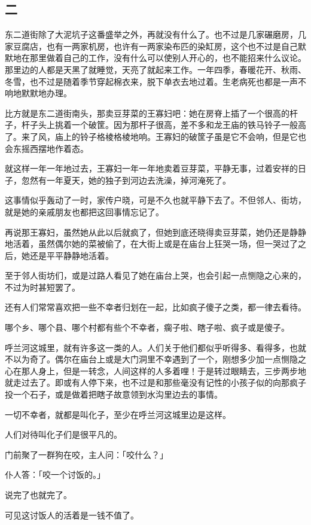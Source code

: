 \documentclass[UTF8]{ctexart}
\begin{document}
\subsection{二}

东二道街除了大泥坑子这番盛举之外，再就没有什么了。也不过是几家碾磨房，几家豆腐店，也有一两家机房，也许有一两家染布匹的染缸房，这个也不过是自己默默地在那里做着自己的工作，没有什么可以使别人开心的，也不能招来什么议论。那里边的人都是天黑了就睡觉，天亮了就起来工作。一年四季，春暖花开、秋雨、冬雪，也不过是随着季节穿起棉衣来，脱下单衣去地过着。生老病死也都是一声不响地默默地办理。

比方就是东二道街南头，那卖豆芽菜的王寡妇吧：她在房脊上插了一个很高的杆子，杆子头上挑着一个破筐。因为那杆子很高，差不多和龙王庙的铁马铃子一般高了。来了风，庙上的铃子格棱格棱地响。王寡妇的破筐子虽是它不会响，但是它也会东摇西摆地作着态。

就这样一年一年地过去，王寡妇一年一年地卖着豆芽菜，平静无事，过着安祥的日子，忽然有一年夏天，她的独子到河边去洗澡，掉河淹死了。

这事情似乎轰动了一时，家传户晓，可是不久也就平静下去了。不但邻人、街坊，就是她的亲戚朋友也都把这回事情忘记了。

再说那王寡妇，虽然她从此以后就疯了，但她到底还晓得卖豆芽菜，她仍还是静静地活着，虽然偶尔她的菜被偷了，在大街上或是在庙台上狂哭一场，但一哭过了之后，她还是平平静静地活着。

至于邻人街坊们，或是过路人看见了她在庙台上哭，也会引起一点恻隐之心来的，不过为时甚短罢了。

还有人们常常喜欢把一些不幸者归划在一起，比如疯子傻子之类，都一律去看待。

哪个乡、哪个县、哪个村都有些个不幸者，瘸子啦、瞎子啦、疯子或是傻子。

呼兰河这城里，就有许多这一类的人。人们关于他们都似乎听得多、看得多，也就不以为奇了。偶尔在庙台上或是大门洞里不幸遇到了一个，刚想多少加一点恻隐之心在那人身上，但是一转念，人间这样的人多着哩！于是转过眼睛去，三步两步地就走过去了。即或有人停下来，也不过是和那些毫没有记性的小孩子似的向那疯子投一个石子，或是做着把瞎子故意领到水沟里边去的事情。

一切不幸者，就都是叫化子，至少在呼兰河这城里边是这样。

人们对待叫化子们是很平凡的。

门前聚了一群狗在咬，主人问：「咬什么？」

仆人答：「咬一个讨饭的。」

说完了也就完了。

可见这讨饭人的活着是{一钱不值}了。
\end{document}
